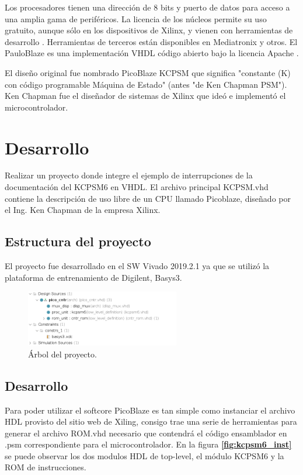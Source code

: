 \documentclass[11pt, a4paper]{article}
\begin{document}
	Los procesadores tienen una dirección de 8 bits y puerto de datos para acceso a una amplia gama de periféricos. La licencia de los núcleos permite su uso gratuito, aunque sólo en los dispositivos de Xilinx, y vienen con herramientas de desarrollo . Herramientas de terceros están disponibles en Mediatronix y otros. El PauloBlaze es una implementación VHDL código abierto bajo la licencia Apache .

	El diseño original fue nombrado PicoBlaze KCPSM que significa "constante (K) con código programable Máquina de Estado" (antes "de Ken Chapman PSM"). Ken Chapman fue el diseñador de sistemas de Xilinx que ideó e implementó el microcontrolador.

\section{Desarrollo}
	Realizar  un proyecto donde integre el ejemplo de interrupciones de la documentación del KCPSM6 en VHDL. El archivo principal KCPSM.vhd contiene la descripción de uso libre de un CPU llamado Picoblaze, diseñado por el Ing. Ken Chapman de la empresa Xilinx. 

	\subsection{Estructura del proyecto}
		El proyecto fue desarrollado en el SW Vivado 2019.2.1 ya que se utilizó la plataforma de entrenamiento de Digilent, Basys3.

		\begin{figure}[H]
			\centering
			\includegraphics[width=0.6\textwidth]{Imagenes/proy-tree.png}
			\caption{Árbol del proyecto.}
			\label{fig:pry-tree}
		\end{figure} 

	\subsection{Desarrollo}
	Para poder utilizar el softcore PicoBlaze es tan simple como instanciar el archivo HDL provisto del sitio web de Xiling, consigo trae una serie de herramientas para generar el archivo ROM.vhd necesario que contendrá el código ensamblador en .psm correspondiente para el microcontrolador. En la figura \textcolor{blue}{\textbf{\ref{fig:kcpsm6_inst}}} se puede observar los dos modulos HDL de top-level, el módulo KCPSM6 y la ROM de instrucciones. 
\end{document}
